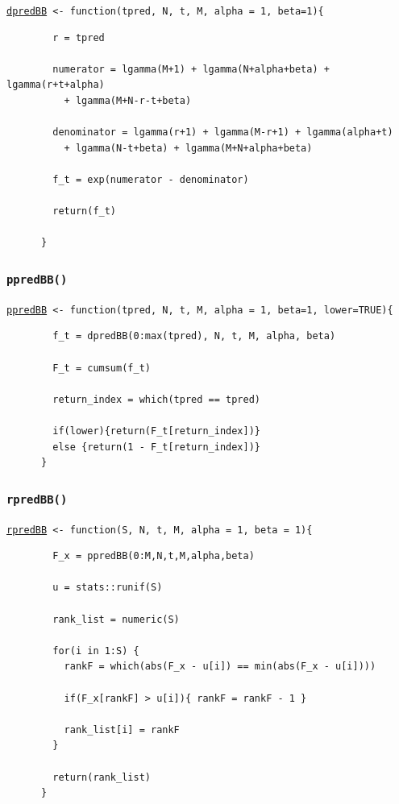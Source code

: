 \documentclass[12pt, a4paper]{article}
\begin{document}
    \texttt{\hyperref[sec:BBimp]{dpredBB} <- function(tpred, N, t, M, alpha = 1, beta=1)\{ }

    \begin{verbatim}
        r = tpred

        numerator = lgamma(M+1) + lgamma(N+alpha+beta) + lgamma(r+t+alpha)
          + lgamma(M+N-r-t+beta)

        denominator = lgamma(r+1) + lgamma(M-r+1) + lgamma(alpha+t)
          + lgamma(N-t+beta) + lgamma(M+N+alpha+beta)

        f_t = exp(numerator - denominator)

        return(f_t)

      }
    \end{verbatim}

    \subsubsection{\texttt{ppredBB()}}\label{sec:ppredBB}

    \texttt{\hyperref[sec:BBimp]{ppredBB} <- function(tpred, N, t, M, alpha = 1, beta=1, lower=TRUE)\{ }

    \begin{verbatim}
        f_t = dpredBB(0:max(tpred), N, t, M, alpha, beta)

        F_t = cumsum(f_t)

        return_index = which(tpred == tpred)

        if(lower){return(F_t[return_index])}
        else {return(1 - F_t[return_index])}
      }
    \end{verbatim}

    \subsubsection{\texttt{rpredBB()}}\label{sec:rpredBB}

    \texttt{\hyperref[sec:BBimp]{rpredBB} <- function(S, N, t, M, alpha = 1, beta = 1)\{ }

    \begin{verbatim}
        F_x = ppredBB(0:M,N,t,M,alpha,beta)

        u = stats::runif(S)

        rank_list = numeric(S)

        for(i in 1:S) {
          rankF = which(abs(F_x - u[i]) == min(abs(F_x - u[i])))

          if(F_x[rankF] > u[i]){ rankF = rankF - 1 }

          rank_list[i] = rankF
        }

        return(rank_list)
      }
    \end{verbatim}
\end{document}
